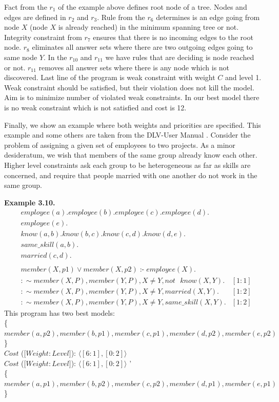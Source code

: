 \documentclass[14pt,a4paper, titlepage]{article}
\DeclareMathOperator{\leftimpl}{:-}
\begin{document}
Fact from the $r_1$ of the example above defines root node of a tree. Nodes and edges are defined in $r_2$ and $r_3$. Rule from the $r_6$ determines is an edge going from node $X$ (node $X$ is already reached) in the minimum spanning tree or not. Integrity constraint from $r_7$ ensures that there is no incoming edges to the root node. $r_8$ eliminates all answer sets where there are two outgoing edges going to same node $Y$. In the $r_{10}$ and $r_{11}$ we have rules that are deciding is node reached or not. $r_{11}$ removes all answer sets where there is any node which is not discovered. Last line of the program is weak constraint with weight $C$ and level 1. Weak constraint should be satisfied, but their violation does not kill the model. Aim is to minimize number of violated weak constraints. In our best model there is no weak constraint which is not satisfied and cost is 12.  


Finally, we show an example where both weights and priorities are specified. This example and some others are taken from the DLV-User Manual \cite{dlvum}. Consider the problem of assigning a given set of employees to two projects. As a minor desideratum, we wish that members of the same group already know each other. Higher level constraints ask each group to be heterogeneous as far as skills are concerned, and require that people married with one another do not work in the same group.

\textbf{Example 3.10.}
\begin{align*}
& \mathit{employee}(a). \mathit{employee}(b).   \mathit{employee}(c). \mathit{employee(d)}. \\
& \mathit{employee}(e). \\
& \mathit{know}(a,b). \mathit{know}(b,c). \mathit{know}(c,d). \mathit{know}(d,e). \\
& \mathit{same\_skill}(a,b). \\
& \mathit{married(c,d)}. \\
&  \\ 
& \mathit{member}(X,p1) \vee \mathit{member}(X,p2) \leftimpl \mathit{employee}(X).\\
& : \sim \mathit{member}(X,P), \mathit{member}(Y,P), X \neq Y, \mathit{not} \text{ } \mathit{know(X,Y)}. & [1:1] \\
& : \sim  \mathit{member}(X,P), \mathit{member}(Y,P), X \neq Y, \mathit{marrie}d(X,Y). & [1:2]\\
& : \sim member(X,P), member(Y,P), X \neq Y, same\_skill(X,Y). & [1:2] 
\end{align*}
This program has two best models:
\\ \{$\mathit{member}(a,p2), \mathit{member}(b,p1), \mathit{member}(c,p1), \mathit{member}(d,p2), \mathit{member}(e,p2)$\}
\\$\mathit{Cost}$ ($[ \mathit{Weight:Level]}$): $ \langle [6:1],[0:2] \rangle $
\\$\mathit{Cost}$ ($[ \mathit{Weight:Level]}$): $ \langle [6:1],[0:2] \rangle $ '\\
\{$\mathit{member}(a,p1), \mathit{member}(b,p2), \mathit{member}(c,p2), \mathit{member}(d,p1), \mathit{member}(e,p1)$\}
\end{document}
